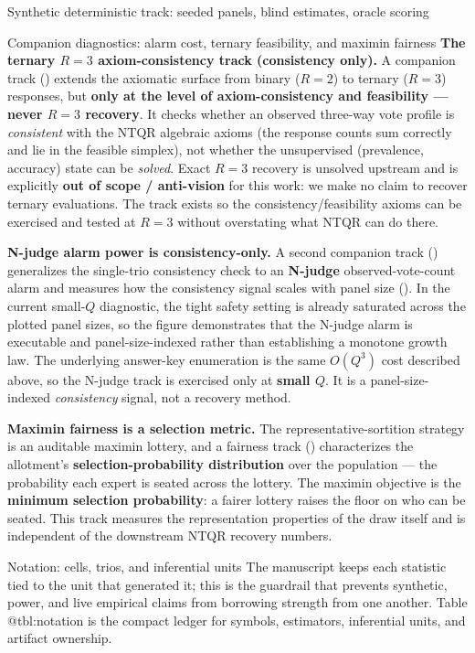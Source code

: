 \documentclass[
  ignorenonframetext,
]{beamer}
\begin{document}
\begin{frame}{Synthetic deterministic track:
seeded panels, blind estimates, oracle scoring}
\begin{block}{Companion diagnostics: alarm cost, ternary feasibility,
and maximin fairness}
\textbf{The ternary \(R=3\) axiom-consistency track (consistency only).}
A companion track () extends the
axiomatic surface from binary (\(R=2\)) to ternary (\(R=3\)) responses,
but \textbf{only at the level of axiom-consistency and feasibility ---
never \(R=3\) recovery}. It checks whether an observed three-way vote
profile is \emph{consistent} with the NTQR algebraic axioms (the
response counts sum correctly and lie in the feasible simplex), not
whether the unsupervised (prevalence, accuracy) state can be
\emph{solved}. Exact \(R=3\) recovery is unsolved upstream and is
explicitly \textbf{out of scope / anti-vision} for this work: we make no
claim to recover ternary evaluations. The track exists so the
consistency/feasibility axioms can be exercised and tested at \(R=3\)
without overstating what NTQR can do there.

\textbf{N-judge alarm power is consistency-only.} A second companion
track () generalizes the
single-trio consistency check to an \textbf{N-judge} observed-vote-count
alarm and measures how the consistency signal scales with panel size
(). In the current small-\(Q\) diagnostic,
the tight safety setting is already saturated across the plotted panel
sizes, so the figure demonstrates that the N-judge alarm is executable
and panel-size-indexed rather than establishing a monotone growth law.
The underlying answer-key enumeration is the same \(O(Q^3)\) cost
described above, so the N-judge track is exercised only at \textbf{small
\(Q\)}. It is a panel-size-indexed \emph{consistency} signal, not a
recovery method.

\textbf{Maximin fairness is a selection metric.} The
representative-sortition strategy is an auditable maximin lottery, and a
fairness track () characterizes
the allotment's \textbf{selection-probability distribution} over the
population --- the probability each expert is seated across the lottery.
The maximin objective is the \textbf{minimum selection probability}: a
fairer lottery raises the floor on who can be seated. This track
measures the representation properties of the draw itself and is
independent of the downstream NTQR recovery numbers.
\end{block}

\begin{block}{Notation: cells, trios, and inferential units}
\protect{}\label{notation-cells-trios-and-inferential-units}
The manuscript keeps each statistic tied to the unit that generated it;
this is the guardrail that prevents synthetic, power, and live empirical
claims from borrowing strength from one another. Table @tbl:notation is
the compact ledger for symbols, estimators, inferential units, and
artifact ownership.


\end{block}
\end{frame}
\end{document}
